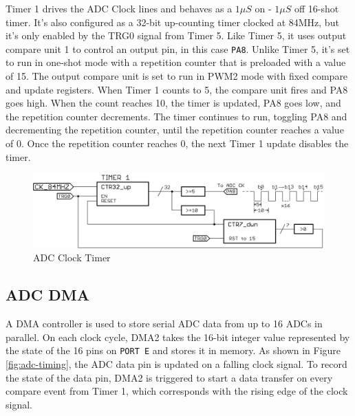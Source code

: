 \documentclass[11pt,twoside]{mitthesis}
\begin{document}
Timer 1 drives the ADC Clock lines and behaves as a $1\mu S$ on - $1\mu S$ off 16-shot timer.
It's also configured as a 32-bit up-counting timer clocked at 84MHz, but it's only enabled by the TRG0 signal from Timer 5.
Like Timer 5, it uses output compare unit 1 to control an output pin, in this case \texttt{PA8}.
Unlike Timer 5, it's set to run in one-shot mode with a repetition counter that is preloaded with a value of 15.
The output compare unit is set to run in PWM2 mode with fixed compare and update registers.
When Timer 1 counts to 5, the compare unit fires and PA8 goes high.
When the count reaches 10, the timer is updated, PA8 goes low, and the repetition counter decrements.
The timer continues to run, toggling PA8 and decrementing the repetition counter, until the repetition counter reaches a value of 0.
Once the repetition counter reaches 0, the next Timer 1 update disables the timer.



\begin{figure}[h!]
  \begin{center}
      \includegraphics[width=1\textwidth]{../tim1.png}
      \caption{ADC Clock Timer}
  \end{center}
\end{figure}


\subsection{ADC DMA}

A DMA controller is used to store serial ADC data from up to 16 ADCs in parallel.
On each clock cycle, DMA2 takes the 16-bit integer value represented by the state of the 16 pins on \texttt{PORT E} and stores it in memory. 
As shown in Figure \ref{fig:adc-timing}, the ADC data pin is updated on a falling clock signal.
To record the state of the data pin, DMA2 is triggered to start a data transfer on every compare event from Timer 1, which corresponds with the rising edge of the clock signal.
\end{document}
